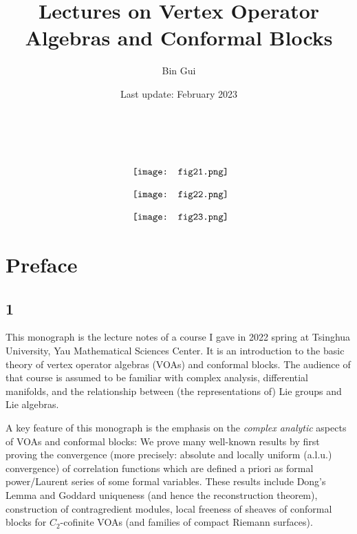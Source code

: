 \documentclass[11pt,b5paper,notitlepage]{article}
\title{Lectures on Vertex Operator Algebras and Conformal Blocks}
\author{{\sc Bin Gui}
}
\date{Last update: February 2023}
\theoremstyle{definition}
\theoremstyle{plain}
\numberwithin{equation}{section}
\begin{document}
\sloppy %
	\setcounter{page}{0}
	\setcounter{section}{-1}
	






	
	\maketitle
\thispagestyle{empty}	
\begin{gather*}
{~}\\[3ex]
	\vcenter{\hbox{{
				\texttt{[image: fig21.png]}}}}\\[2ex]
	\vcenter{\hbox{{
				\texttt{[image: fig22.png]}}}}\\[2ex]
	\vcenter{\hbox{{
				\texttt{[image: fig23.png]}}}}
\end{gather*}




	
	\newpage
\tableofcontents
	


\newpage

\section*{Preface}


\subsection*{1}


This monograph is the lecture notes of a course I gave in 2022 spring at Tsinghua University, Yau Mathematical Sciences Center. It is an introduction to the basic theory of vertex operator algebras (VOAs) and conformal blocks. The audience of that course is assumed to be familiar with complex analysis, differential manifolds, and the relationship between (the representations of) Lie groups and Lie algebras. 

A key feature of this monograph is the emphasis on the \emph{complex analytic} aspects of VOAs and conformal blocks: We prove many well-known results by first proving the convergence (more precisely: absolute and locally uniform (a.l.u.) convergence) of  correlation functions which are defined a priori as formal power/Laurent series of some formal variables. These results include Dong's Lemma and Goddard uniqueness (and hence the reconstruction theorem), construction of contragredient modules, local freeness of sheaves of conformal blocks for $C_2$-cofinite VOAs (and families of compact Riemann surfaces). 
\end{document}

